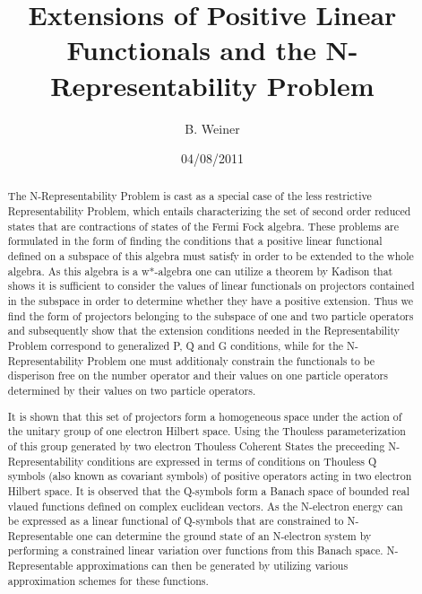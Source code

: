 \documentclass[aps,preprint]{revtex4}%
\begin{document}
\preprint{ }
\title[Positive Functionals]{Extensions of Positive Linear Functionals and the N-Representability Problem }
\author{B. Weiner}

\begin{abstract}
The N-Representability Problem is cast as a special case of the less
restrictive Representability Problem, which entails characterizing the set of
second order reduced states that are contractions of states of the Fermi Fock
algebra. These problems are formulated in the form of finding the conditions
that a positive linear functional defined on a subspace of this algebra must
satisfy in order to be extended to the whole algebra. As this algebra is a
w*-algebra one can utilize a theorem by Kadison that shows it is sufficient to
consider the values of linear functionals on projectors contained in the
subspace in order to determine whether they have a positive extension. Thus we
find the form of projectors belonging to the subspace of one and two particle
operators and subsequently show that the extension conditions needed in the
Representability Problem correspond to generalized P, Q and G conditions,
while for the N-Representability Problem one must additionaly constrain the
functionals to be disperison free on the number operator and their values on
one particle operators determined by their values on two particle operators.

It is shown that this set of projectors form a homogeneous space under the
action of the unitary group of one electron Hilbert space. Using the Thouless
parameterization of this group generated by two electron Thouless Coherent
States the preceeding N-Representability conditions are expressed in terms of
conditions on Thouless Q symbols (also known as covariant symbols) of positive
operators acting in two electron Hilbert space. It is observed that the
Q-symbols form a Banach space of bounded real vlaued functions defined on
complex euclidean vectors. As the N-electron energy can be expressed as a
linear functional of Q-symbols that are constrained to N-Representable one can
determine the ground state of an N-electron system by performing a constrained
linear variation over functions from this Banach space. N-Representable
approximations can then be generated by utilizing various approximation
schemes for these functions.

\end{abstract}
\date{04/08/2011}
\maketitle
\tableofcontents
\end{document}
